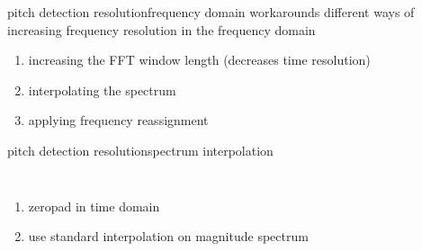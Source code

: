         \begin{frame}{pitch detection resolution}{frequency domain workarounds}
            different ways of increasing frequency resolution in the frequency domain
            \begin{enumerate}
                \item<1->   increasing the FFT window length (decreases time resolution)
                \bigskip
                \item<2->   interpolating  the spectrum
                \bigskip
                \item<3->   applying frequency reassignment
            \end{enumerate}
        \end{frame}

        \begin{frame}{pitch detection resolution}{spectrum interpolation}
            \begin{columns}
            \begin{enumerate}
                \item<1->   zeropad in time domain
                \bigskip
                \bigskip
                \bigskip
                \item<1->   use standard interpolation on magnitude spectrum
            \end{enumerate}
            \end{columns}
        \end{frame}
